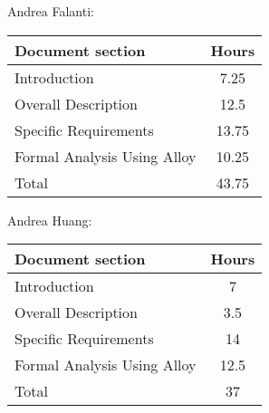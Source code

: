 Andrea Falanti:

\begin{tabular}{|l|c|}
    \hline
    Document section & Hours \\
    \hline
     Introduction & 7.25\\
     Overall Description & 12.5\\
     Specific Requirements & 13.75\\
     Formal Analysis Using Alloy & 10.25\\
     \hline
     Total & 43.75\\
     \hline
\end{tabular}
\vskip 0.3in

Andrea Huang:

\begin{tabular}{|l|c|}
    \hline
    Document section & Hours \\
    \hline
     Introduction &  7\\
     Overall Description & 3.5\\
     Specific Requirements & 14\\
     Formal Analysis Using Alloy & 12.5\\
     \hline
     Total & 37\\
     \hline
\end{tabular}